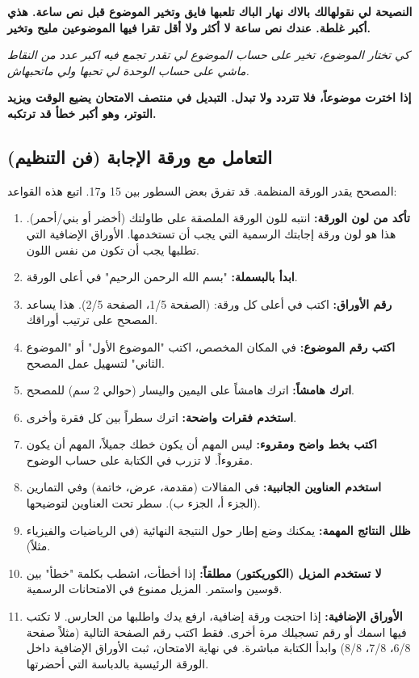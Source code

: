 \documentclass[12pt,a4paper]{book}
\newcommand{\quoteAr}[1]{%
	\begin{myquote}
		\itshape #1
	\end{myquote}
}
\newcommand{\importantAr}[1]{%
	\begin{important}
		\bfseries #1
	\end{important}
}
\begin{document}
	\importantAr{النصيحة لي نقولهالك بالاك نهار الباك تلعبها فايق وتخير الموضوع قبل نص ساعة. هذي أكبر غلطة. عندك نص ساعة لا أكثر ولا أقل تقرا فيها الموضوعين مليح وتخير.}
	
	\quoteAr{كي تختار الموضوع، تخير على حساب الموضوع لي تقدر تجمع فيه اكبر عدد من النقاط ماشي على حساب الوحدة لي تحبها ولي ماتحبهاش.}
	
	\importantAr{إذا اخترت موضوعاً، فلا تتردد ولا تبدل. التبديل في منتصف الامتحان يضيع الوقت ويزيد التوتر، وهو أكبر خطأ قد ترتكبه.}
	
	\subsection{التعامل مع ورقة الإجابة (فن التنظيم)}
	المصحح يقدر الورقة المنظمة. قد تفرق بعض السطور بين 15 و17. اتبع هذه القواعد:
	
	\begin{enumerate}
		\item \textbf{تأكد من لون الورقة:} انتبه للون الورقة الملصقة على طاولتك (أخضر أو بني/أحمر). هذا هو لون ورقة إجابتك الرسمية التي يجب أن تستخدمها. الأوراق الإضافية التي تطلبها يجب أن تكون من نفس اللون.
		\item \textbf{ابدأ بالبسملة:} "بسم الله الرحمن الرحيم" في أعلى الورقة.
		\item \textbf{رقم الأوراق:} اكتب في أعلى كل ورقة: (الصفحة 1/5، الصفحة 2/5). هذا يساعد المصحح على ترتيب أوراقك.
		\item \textbf{اكتب رقم الموضوع:} في المكان المخصص، اكتب "الموضوع الأول" أو "الموضوع الثاني" لتسهيل عمل المصحح.
		\item \textbf{اترك هامشاً:} اترك هامشاً على اليمين واليسار (حوالي 2 سم) للمصحح.
		\item \textbf{استخدم فقرات واضحة:} اترك سطراً بين كل فقرة وأخرى.
		\item \textbf{اكتب بخط واضح ومقروء:} ليس المهم أن يكون خطك جميلاً، المهم أن يكون مقروءاً. لا تزرب في الكتابة على حساب الوضوح.
		\item \textbf{استخدم العناوين الجانبية:} في المقالات (مقدمة، عرض، خاتمة) وفي التمارين (الجزء أ، الجزء ب). سطر تحت العناوين لتوضيحها.
		\item \textbf{ظلل النتائج المهمة:} يمكنك وضع إطار حول النتيجة النهائية (في الرياضيات والفيزياء مثلاً).
		\item \textbf{لا تستخدم المزيل (الكوريكتور) مطلقاً:} إذا أخطأت، اشطب بكلمة "خطأ" بين قوسين واستمر. المزيل ممنوع في الامتحانات الرسمية.
		\item \textbf{الأوراق الإضافية:} إذا احتجت ورقة إضافية، ارفع يدك واطلبها من الحارس. لا تكتب فيها اسمك أو رقم تسجيلك مرة أخرى. فقط اكتب رقم الصفحة التالية (مثلاً صفحة 6/8، 7/8، 8/8) وابدأ الكتابة مباشرة. في نهاية الامتحان، ثبت الأوراق الإضافية داخل الورقة الرئيسية بالدباسة التي أحضرتها.
	\end{enumerate}
	
\end{document}
